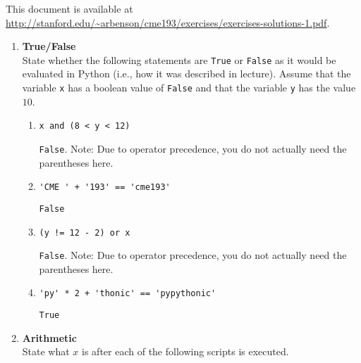 \documentclass{article}
\begin{document}
\pagestyle{fancy}

This document is available at \url{http://stanford.edu/~arbenson/cme193/exercises/exercises-solutions-1.pdf}.


\begin{enumerate}
\item \textbf{True/False} \\
State whether the following statements are \texttt{True} or \texttt{False} as it would be evaluated in Python (i.e., how it was described in lecture).  Assume that the variable \texttt{x} has a boolean value of \texttt{False} and that the variable \texttt{y} has the value $10$.

\begin{enumerate}
\item
\begin{lstlisting}
x and (8 < y < 12)
\end{lstlisting}
\texttt{False}.  Note: Due to operator precedence, you do not actually need the parentheses here.
\end{enumerate}

\begin{enumerate}
\setcounter{enumii}{1}
\item 
\begin{lstlisting}
'CME ' + '193' == 'cme193'
\end{lstlisting}
\texttt{False}
\end{enumerate}

\begin{enumerate}
\setcounter{enumii}{2}
\item 
\begin{lstlisting}
(y != 12 - 2) or x
\end{lstlisting}
\texttt{False}.  Note: Due to operator precedence, you do not actually need the parentheses here.
\end{enumerate}

\begin{enumerate}
\setcounter{enumii}{3}
\item 
\begin{lstlisting}
'py' * 2 + 'thonic' == 'pypythonic'
\end{lstlisting}
\texttt{True}
\end{enumerate}

\item \textbf{Arithmetic} \\
State what $x$ is after each of the following scripts is executed.


\end{enumerate}
\end{document}
